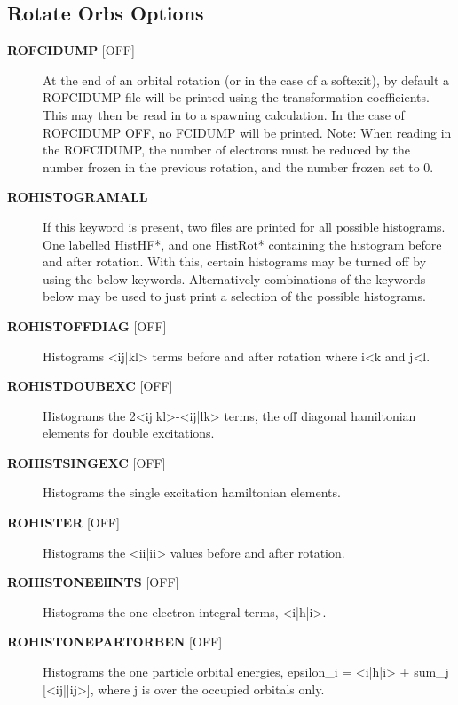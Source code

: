 \documentclass[openany,a4paper,10pt]{manual}
\begin{document}
\subsection{Rotate Orbs Options}
\begin{description}
\item[\textbf{ROFCIDUMP} {[}OFF{]}]
At the end of an orbital rotation (or in the case of a softexit), by default
a ROFCIDUMP file will be printed using the transformation coefficients.
This may then be read in to a spawning calculation.
In the case of ROFCIDUMP OFF, no FCIDUMP will be printed.
Note: When reading in the ROFCIDUMP, the number of electrons must be reduced
by the number frozen in the previous rotation, and the number frozen set to 0.

\item[\textbf{ROHISTOGRAMALL}]
If this keyword is present, two files are printed for all possible histograms.
One labelled HistHF*, and one HistRot* containing the histogram before and after rotation.
With this, certain histograms may be turned off by using the below keywords.
Alternatively combinations of the keywords below may be used to just print a selection
of the possible histograms.

\item[\textbf{ROHISTOFFDIAG} {[}OFF{]}]
Histograms \textless{}ij|kl\textgreater{} terms before and after rotation where i\textless{}k and j\textless{}l.

\item[\textbf{ROHISTDOUBEXC} {[}OFF{]}]
Histograms the 2\textless{}ij|kl\textgreater{}-\textless{}ij|lk\textgreater{} terms, the off diagonal hamiltonian elements for double
excitations.

\item[\textbf{ROHISTSINGEXC} {[}OFF{]}]
Histograms the single excitation hamiltonian elements.

\item[\textbf{ROHISTER} {[}OFF{]}]
Histograms the \textless{}ii|ii\textgreater{} values before and after rotation.

\item[\textbf{ROHISTONEElINTS} {[}OFF{]}]
Histograms the one electron integral terms, \textless{}i|h|i\textgreater{}.

\item[\textbf{ROHISTONEPARTORBEN} {[}OFF{]}]
Histograms the one particle orbital energies, epsilon\_i = \textless{}i|h|i\textgreater{} + sum\_j {[}\textless{}ij||ij\textgreater{}{]},
where j is over the occupied orbitals only.

\end{description}
\end{document}
